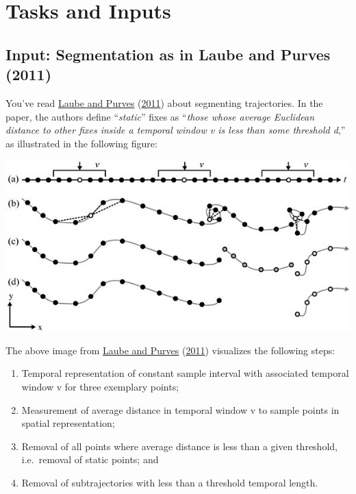 \documentclass[
]{book}
\providecommand{\tightlist}{%
  \setlength{\itemsep}{0pt}\setlength{\parskip}{0pt}}
\begin{document}
\hypertarget{tasks-and-inputs-2}{%
\section{Tasks and Inputs}\label{tasks-and-inputs-2}}

\hypertarget{input-segmentation-as-in-laube-and-purves-2011}{%
\subsection{Input: Segmentation as in Laube and Purves (2011)}\label{input-segmentation-as-in-laube-and-purves-2011}}

You've read \protect\hyperlink{ref-laube2011}{Laube and Purves} (\protect\hyperlink{ref-laube2011}{2011}) about segmenting trajectories. In the paper, the authors define ``\emph{static}'' fixes as ``\emph{those whose average Euclidean distance to other fixes inside a temporal window v is less than some threshold d},'' as illustrated in the following figure:

\includegraphics{02_Images/laube_2011.jpg}

The above image from \protect\hyperlink{ref-laube2011}{Laube and Purves} (\protect\hyperlink{ref-laube2011}{2011}) visualizes the following steps:

\begin{enumerate}
\def\labelenumi{(\alph{enumi})}
\tightlist
\item
  Temporal representation of constant sample interval with associated temporal window v for three exemplary points;
\item
  Measurement of average distance in temporal window v to sample points in spatial representation;
\item
  Removal of all points where average distance is less than a given threshold, i.e.~removal of static points; and
\item
  Removal of subtrajectories with less than a threshold temporal length.
\end{enumerate}
\end{document}
